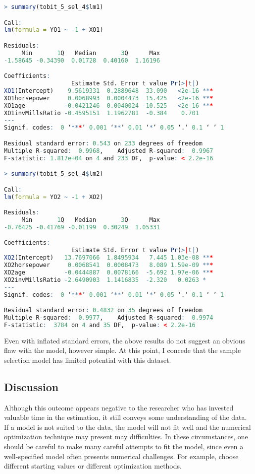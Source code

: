 \documentclass[11pt]{paper}
\begin{document}
\begin{lstlisting}[language=R]
> summary(tobit_5_sel_4$lm1)

Call:
lm(formula = YO1 ~ -1 + XO1)

Residuals:
     Min       1Q   Median       3Q      Max 
-1.58645 -0.34390  0.01728  0.40160  1.16196 

Coefficients:
                   Estimate Std. Error t value Pr(>|t|)    
XO1(Intercept)    9.5619331  0.2889648  33.090   <2e-16 ***
XO1horsepower     0.0068993  0.0004473  15.425   <2e-16 ***
XO1age           -0.0421246  0.0040024 -10.525   <2e-16 ***
XO1invMillsRatio -0.4595151  1.1962781  -0.384    0.701    
---
Signif. codes:  0 ‘***’ 0.001 ‘**’ 0.01 ‘*’ 0.05 ‘.’ 0.1 ‘ ’ 1

Residual standard error: 0.543 on 233 degrees of freedom
Multiple R-squared:  0.9968,	Adjusted R-squared:  0.9967 
F-statistic: 1.817e+04 on 4 and 233 DF,  p-value: < 2.2e-16

> summary(tobit_5_sel_4$lm2)

Call:
lm(formula = YO2 ~ -1 + XO2)

Residuals:
     Min       1Q   Median       3Q      Max 
-0.76425 -0.41769 -0.01199  0.30249  1.05331 

Coefficients:
                   Estimate Std. Error t value Pr(>|t|)    
XO2(Intercept)   13.7697066  1.8495934   7.445 1.03e-08 ***
XO2horsepower     0.0068541  0.0008473   8.089 1.59e-09 ***
XO2age           -0.0444887  0.0078166  -5.692 1.97e-06 ***
XO2invMillsRatio -2.6490903  1.1416835  -2.320   0.0263 *  
---
Signif. codes:  0 ‘***’ 0.001 ‘**’ 0.01 ‘*’ 0.05 ‘.’ 0.1 ‘ ’ 1

Residual standard error: 0.4832 on 35 degrees of freedom
Multiple R-squared:  0.9977,	Adjusted R-squared:  0.9974 
F-statistic:  3784 on 4 and 35 DF,  p-value: < 2.2e-16
\end{lstlisting}

Even with inflated standard errors, 
the above results do not suggest an obvious flaw with the model, 
however simple. 
At this point, I concede that the sample selection model has limited potential
with this dataset. 

\subsection{Discussion}

Although this outcome appears negative to the researcher 
who has invested valuable time in the estimation, 
it still conveys some understanding of the data. 
If a model is not suited to the data, the model will not fit well
and the numerical optimization technique may present may difficulties.
In these circumstances, one should be careful to make many careful attempts to fit the model, since even a well-specified model often presents numerical challenges. 
For example, choose different starting values or different optimization methods. 
% 
\end{document}
